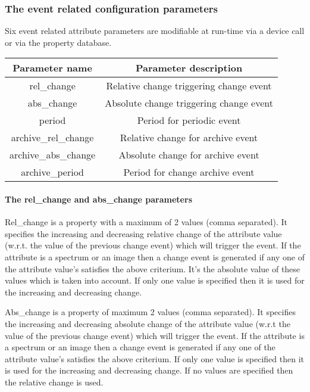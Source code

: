 \subsubsection{The event related configuration parameters}

Six event related attribute parameters are modifiable
at run-time via a device call or via the property database.

\vspace{0.3cm}


\begin{center}
\begin{longtable}{|c|c|}
\hline 
Parameter name & Parameter description\tabularnewline
\hline 
\hline 
rel\_change & Relative change triggering change event\tabularnewline
\hline 
abs\_change & Absolute change triggering change event\tabularnewline
\hline 
\hline 
period  & Period for periodic event\tabularnewline
\hline 
\hline 
archive\_rel\_change  & Relative change for archive event\tabularnewline
\hline 
archive\_abs\_change & Absolute change for archive event\tabularnewline
\hline 
archive\_period  & Period for change archive event\tabularnewline
\hline 
\end{longtable}
\par\end{center}

\vspace{0.3cm}



\paragraph{The rel\_change and abs\_change parameters}

Rel\_change is a property with a maximum of 2 values
(comma separated). It specifies the increasing and decreasing relative
change of the attribute value (w.r.t. the value of the previous change
event) which will trigger the event. If the attribute is a spectrum
or an image then a change event is generated if any one of the attribute
value's satisfies the above criterium. It's the absolute value of
these values which is taken into account. If only one value is specified
then it is used for the increasing and decreasing change.

Abs\_change is a property of maximum 2 values (comma
separated). It specifies the increasing and decreasing absolute change
of the attribute value (w.r.t the value of the previous change event)
which will trigger the event. If the attribute is a spectrum or an
image then a change event is generated if any one of the attribute
value's satisfies the above criterium. If only one value is specified
then it is used for the increasing and decreasing change. If no values
are specified then the relative change is used.



